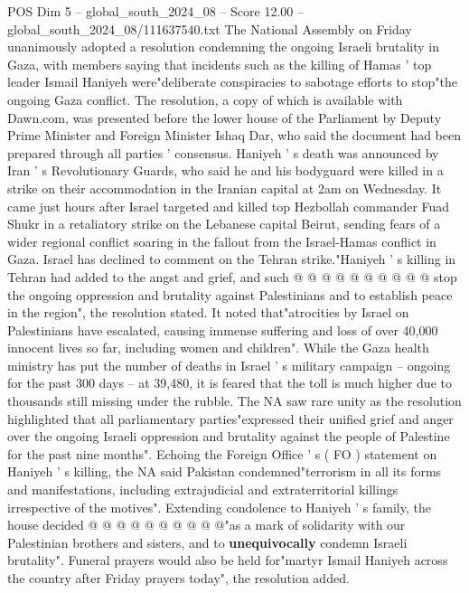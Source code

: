 \begin{textsample}{POS Dim 5 – global\_south\_2024\_08 – Score 12.00 – global\_south\_2024\_08/111637540.txt}  \label{ex:f5_pos_327}
The National Assembly on Friday unanimously adopted a resolution condemning the ongoing Israeli brutality in Gaza, with members saying that incidents such as the killing of Hamas ' top leader Ismail Haniyeh were"deliberate conspiracies to sabotage efforts to stop"the ongoing Gaza conflict.
The resolution, a copy of which is available with Dawn.com, was presented before the lower house of the Parliament by Deputy Prime Minister and Foreign Minister Ishaq Dar, who said the document had been prepared through all parties ' consensus.
Haniyeh ' s death was announced by Iran ' s Revolutionary Guards, who said he and his bodyguard were killed in a strike on their accommodation in the Iranian capital at 2am on Wednesday.
It came just hours after Israel targeted and killed top Hezbollah commander Fuad Shukr in a retaliatory strike on the Lebanese capital Beirut, sending fears of a wider regional conflict soaring in the fallout from the Israel-Hamas conflict in Gaza.
Israel has declined to comment on the Tehran strike."Haniyeh ' s killing in Tehran had added to the angst and grief, and such @ @ @ @ @ @ @ @ @ @ stop the ongoing oppression and brutality against Palestinians and to establish peace in the region", the resolution stated.
It noted that"atrocities by Israel on Palestinians have escalated, causing immense suffering and loss of over 40,000 innocent lives so far, including women and children".
While the Gaza health ministry has put the number of deaths in Israel ' s military campaign -- ongoing for the past 300 days -- at 39,480, it is feared that the toll is much higher due to thousands still missing under the rubble.
The NA saw rare unity as the resolution highlighted that all parliamentary parties"expressed their unified grief and anger over the ongoing Israeli oppression and brutality against the people of Palestine for the past nine months".
Echoing the Foreign Office ' s ( FO ) statement on Haniyeh ' s killing, the NA said Pakistan condemned"terrorism in all its forms and manifestations, including extrajudicial and extraterritorial killings irrespective of the motives".
Extending condolence to Haniyeh ' s family, the house decided @ @ @ @ @ @ @ @ @ @"as a mark of solidarity with our Palestinian brothers and sisters, and to \textbf{unequivocally} condemn Israeli brutality".
Funeral prayers would also be held for"martyr Ismail Haniyeh across the country after Friday prayers today", the resolution added.

\end{textsample}
